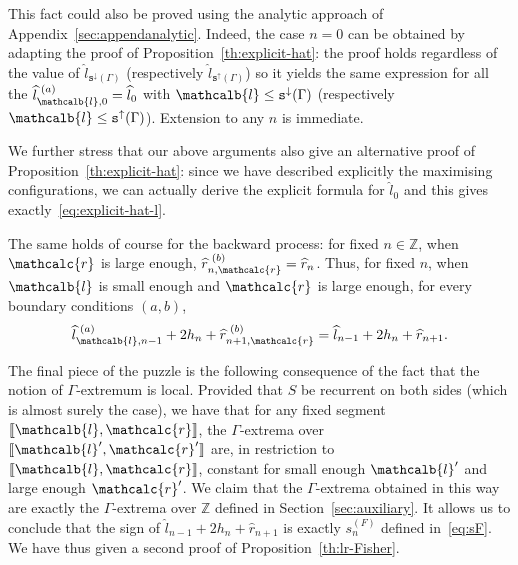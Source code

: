 \documentclass[AHL,Unicode,longabstracts,published]{cedram}
\newcommand{\Z}{\mathbb{Z}}
\newcommand{\gG}{\Gamma}
\newcommand{\ts}{\mathtt{s}}
\newcommand{\tsdown}{\ts^\downarrow}
\newcommand{\tsup}{\ts^\uparrow}
\newcommand{\ls}{\widehat{l}}
\newcommand{\rs}{\widehat{r}}
\renewcommand{\ell}{\mathcalb{l}}
\newcommand{\err}{\mathcalc{r}}
\newcommand{\llbracket}{\mathopen{[\mkern -2.7mu[}}
\newcommand{\rrbracket}{\mathclose{]\mkern -2.7mu]}}
\newcommand{\lbra}{\llbracket}
\newcommand{\rbra}{\rrbracket}
\begin{document}
\begin{rema}
This fact could also be proved using the analytic approach of Appendix~\ref{sec:appendanalytic}. Indeed, the case $n=0$ can be obtained by adapting the proof of Proposition~\ref{th:explicit-hat}: the proof holds regardless of the value of $\ls_{\tsdown(\gG)}$ (respectively $\ls_{\tsup(\gG)}$) so it yields the same expression for all the $\ls_{\ell, 0}^{\,\,(a)}=\ls_0$ with $\ell \le \tsdown(\gG)$ (respectively $\ell \le \tsup(\gG)$). Extension to any $n$ is immediate.

We further stress that our above arguments also give an alternative proof of Proposition~\ref{th:explicit-hat}: since we have described explicitly the maximising configurations, we can actually derive the explicit formula for $\ls_0$ and this gives exactly~\eqref{eq:explicit-hat-l}.
\end{rema} The same holds of course for the backward process: for fixed $n\in\Z$, when $\err $ is large enough, $\rs^{\,\,(b)}_{n, \err}=\rs_n$. Thus, for fixed $n$, when $\ell$ is small enough and $\err$ is large enough, for every boundary conditions $(a, b)$,
\[
\ls_{\ell, n-1}^{\,\,(a)}+2 h_n + \rs_{n+1, \err}^{\,\,(b)}= \ls_{ n-1}+2 h_n + \rs_{n+1}.
\]


The final piece of the puzzle is the following consequence of the fact that the notion of $\gG$-extremum is local. Provided that $S$ be recurrent on both sides (which is almost surely the case), we have that for any fixed segment $\lbra\ell, \err\rbra$, the $\gG$-extrema over $\lbra\ell', \err'\rbra$ are, in restriction to $\lbra\ell, \err\rbra$, constant for small enough $\ell'$ and large enough $\err'$. We claim that the $\gG$-extrema obtained in this way are exactly the $\gG$-extrema over $\Z$ defined in Section~\ref{sec:auxiliary}. It allows us to conclude that the sign of $\ls_{ n-1}+2 h_n + \rs_{n+1}$ is exactly $s^{(F)}_n$ defined in~\eqref{eq:sF}. We have thus given a second proof of Proposition~\ref{th:lr-Fisher}.
\end{document}
